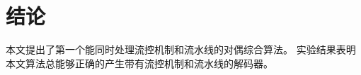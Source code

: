 %
%
%
%
%
%
%
%
%
%


\section{结论}\label{sec_conclude}
本文提出了第一个能同时处理流控机制和流水线的对偶综合算法。
实验结果表明本文算法总能够正确的产生带有流控机制和流水线的解码器。

